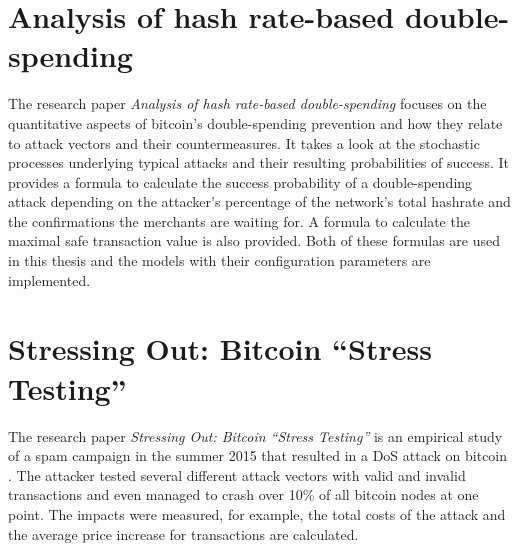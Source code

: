 \section{Analysis of hash rate-based double-spending}
The research paper \textit{Analysis of hash rate-based double-spending} focuses on the quantitative aspects of bitcoin's double-spending prevention and how they relate to attack vectors and their countermeasures. It takes a look at the stochastic processes underlying typical attacks and their resulting probabilities of success. It provides a formula to calculate the success probability of a double-spending attack depending on the attacker's percentage of the network's total hashrate and the confirmations the merchants are waiting for. A formula to calculate the maximal safe transaction value is also provided. Both of these formulas are used in this thesis and the models with their configuration parameters are implemented.

\section{Stressing Out: Bitcoin “Stress Testing”}
The research paper \textit{Stressing Out: Bitcoin “Stress Testing”} is an empirical study of a spam campaign in the summer 2015 that resulted in a DoS attack on bitcoin \cite{DBLP:conf/fc/BaqerHMW16}. The attacker tested several different attack vectors with valid and invalid transactions and even managed to crash over 10\% of all bitcoin nodes at one point. The impacts were measured, for example, the total costs of the attack and the average price increase for transactions are calculated.